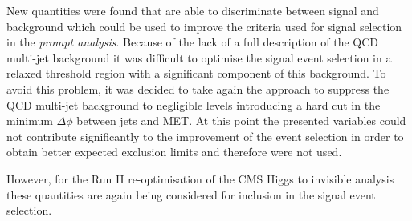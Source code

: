 
New quantities were found that are able to discriminate between signal and background which could be used to improve the criteria used for signal selection in the \textit{prompt analysis}. Because of the lack of a full description of the \gls{QCD} multi-jet background it was difficult to optimise the signal event selection in a relaxed threshold region with a significant component of this background. To avoid this problem, it was decided to take again the approach to suppress the \gls{QCD} multi-jet background to negligible levels introducing a hard cut in the minimum $\Delta\phi$ between jets and \gls{MET}. At this point the presented variables could not contribute significantly to the improvement of the event selection in order to obtain better expected exclusion limits and therefore were not used.

However, for the Run II re-optimisation of the \gls{CMS} Higgs to invisible analysis these quantities are again being considered for inclusion in the signal event selection.
